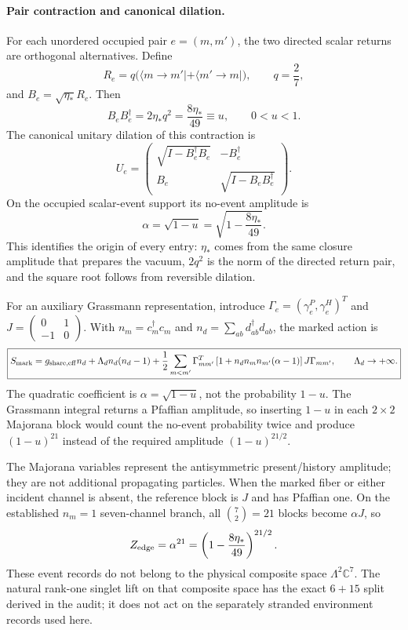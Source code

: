 \documentclass[11pt]{article}
\begin{document}
\paragraph{Pair contraction and canonical dilation.}
For each unordered occupied pair $e=(m,m')$, the two directed scalar returns are orthogonal alternatives. Define
\[
R_e=q\bigl(\langle m\!\to\!m'|+\langle m'\!\to\!m|\bigr),
\qquad q=\frac27,
\]
and $B_e=\sqrt{\eta_*}R_e$. Then
\[
B_eB_e^\dagger=2\eta_*q^2
=\frac{8\eta_*}{49}
\equiv u,
\qquad 0<u<1.
\]
The canonical unitary dilation of this contraction is
\[
U_e=
\begin{pmatrix}
\sqrt{I-B_e^\dagger B_e}&-B_e^\dagger\\
B_e&\sqrt{I-B_eB_e^\dagger}
\end{pmatrix}.
\]
On the occupied scalar-event support its no-event amplitude is
\[
\alpha=\sqrt{1-u}
=\sqrt{1-\frac{8\eta_*}{49}}.
\]
This identifies the origin of every entry: $\eta_*$ comes from the same closure amplitude that prepares the vacuum, $2q^2$ is the norm of the directed return pair, and the square root follows from reversible dilation.

For an auxiliary Grassmann representation, introduce
$\Gamma_e=(\gamma_e^P,\gamma_e^H)^T$ and
$J=\left(\begin{smallmatrix}0&1\\-1&0\end{smallmatrix}\right)$. With
$n_m=c_m^\dagger c_m$ and $n_d=\sum_{ab}d_{ab}^\dagger d_{ab}$, the marked action is
\[
\boxed{
S_{\rm mark}
=g_{\mathrm{share,eff}}n_d
+\Lambda_dn_d(n_d-1)
+\frac12\sum_{m<m'}
\Gamma_{mm'}^T
\left[1+n_dn_mn_{m'}(\alpha-1)\right]J
\Gamma_{mm'},
\qquad \Lambda_d\to+\infty.
}
\]
The quadratic coefficient is $\alpha=\sqrt{1-u}$, not the probability $1-u$. The Grassmann integral returns a Pfaffian amplitude, so inserting $1-u$ in each $2\times2$ Majorana block would count the no-event probability twice and produce $(1-u)^{21}$ instead of the required amplitude $(1-u)^{21/2}$.

The Majorana variables represent the antisymmetric present/history amplitude; they are not additional propagating particles. When the marked fiber or either incident channel is absent, the reference block is $J$ and has Pfaffian one. On the established $n_m=1$ seven-channel branch, all $\binom72=21$ blocks become $\alpha J$, so
\[
Z_{\rm edge}=\alpha^{21}
=\left(1-\frac{8\eta_*}{49}\right)^{21/2}.
\]
These event records do not belong to the physical composite space $\Lambda^2\mathbb C^7$. The natural rank-one singlet lift on that composite space has the exact $6+15$ split derived in the audit; it does not act on the separately stranded environment records used here.
\end{document}
